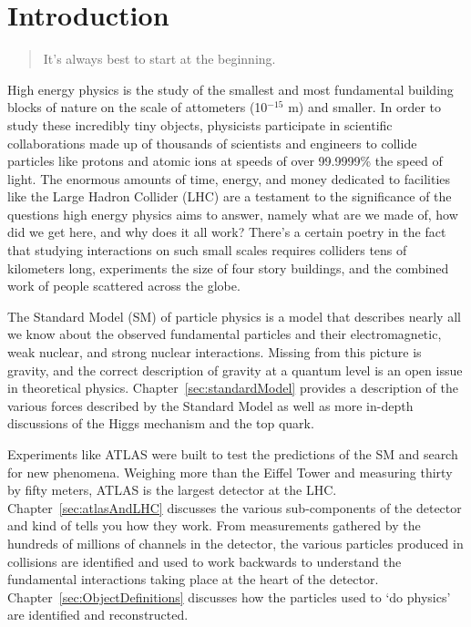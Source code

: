 \chapter{Introduction}
\begin{quote}
\noindent It's always best to start at the beginning.\\ 
\end{quote}

High energy physics is the study of the smallest and most fundamental building blocks of nature on the scale of attometers (10$^{-15}$ m) and smaller. In order to study these incredibly tiny objects, physicists participate in scientific collaborations made up of thousands of scientists and engineers to collide particles like protons and atomic ions at speeds of over 99.9999\% the speed of light. The enormous amounts of time, energy, and money dedicated to facilities like the Large Hadron Collider (LHC) are a testament to the significance of the questions high energy physics aims to answer, namely what are we made of, how did we get here, and why does it all work? There's a certain poetry in the fact that studying interactions on such small scales requires colliders tens of kilometers long, experiments the size of four story buildings, and the combined work of people scattered across the globe.

The Standard Model (SM) of particle physics is a model that describes nearly all we know about the observed fundamental particles and their electromagnetic, weak nuclear, and strong nuclear interactions. Missing from this picture is gravity, and the correct description of gravity at a quantum level is an open issue in theoretical physics. Chapter~\ref{sec:standardModel} provides a description of the various forces described by the Standard Model as well as more in-depth discussions of the Higgs mechanism and the top quark.

Experiments like ATLAS were built to test the predictions of the SM and search for new phenomena. Weighing more than the Eiffel Tower and measuring thirty by fifty meters, ATLAS is the largest detector at the LHC. Chapter~\ref{sec:atlasAndLHC} discusses the various sub-components of the detector and kind of tells you how they work. From measurements gathered by the hundreds of millions of channels in the detector, the various particles produced in collisions are identified and used to work backwards to understand the fundamental interactions taking place at the heart of the detector. Chapter~\ref{sec:ObjectDefinitions} discusses how the particles used to `do physics' are identified and reconstructed.

